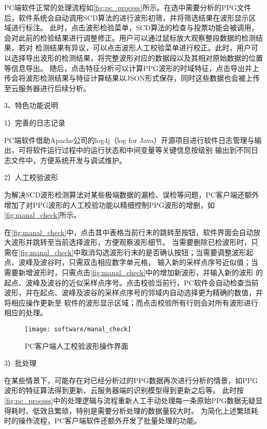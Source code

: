 PC端软件正常的处理流程如\autoref{fig:pc_process}所示。在选中需要分析的PPG文件后，软件系统会自动调用SCD算法的进行波形初筛，并将筛选结果在波形显示区域进行标注。
此时，点击波形检验菜单，SCD算法的检查与投票功能会被调用，会对此前的检验结果进行调整修正。用户可以通过鼠标放大观察整段数据的检测结果，若对
检测结果有异议，可以点击波形人工校验菜单进行校正。此时，用户可以选择导出波形的检测结果，将完整波形对应的数据段以及其相对原始数据的位置等信息导出。
随后，点击特征分析可以计算PPG波形的时域特征，点击导出并上传会将波形检测结果与特征计算结果以JSON形式保存，同时这些数据也会被上传至云服务器进行后续分析。

3、特色功能说明

1）完善的日志记录

PC端软件借助Apache公司的log4j（log for Java）开源项目进行软件日志管理与输出，可将软件运行过程中的运行状态和中间变量等关键信息按级别
输出到不同日志文件中，方便系统开发与调试维护。%

2）人工校验波形

为解决SCD波形检测算法对某些极端数据的漏检、误检等问题，PC客户端还额外增加了对PPG波形的人工校验功能以精细控制PPG波形的增删，如\autoref{fig:manal_check}所示。

在\autoref{fig:manal_check}中，点击其中表格当前行末的跳转至按钮，软件界面会自动放大波形并跳转至当前选择波形，方便观察波形细节。
当需要删除已检波形时，只需在\autoref{fig:manal_check}中取消勾选波形行末的是否确认按钮；当需要调整波形起点、波峰及波谷时，只需双击相应数字单元格，
输入新的采样点序号近似值；当需要新增波形时，只需点击\autoref{fig:manal_check}中的增加新波形，并输入新的波形
的起点、波峰及波谷的近似采样点序号。点击校验当前行，PC软件会自动检查当前波形，并在起点、波峰及波谷的采样点序号的邻域内自动选择更为精确的数值，并将相应操作更新至
软件的波形显示区域；而点击校验所有行则会对所有波形进行相应的处理。
\begin{figure}[htbp]
    \centering
    \texttt{[image: software/manal\_check]}
    \caption{\label{fig:manal_check}PC客户端人工校验波形操作界面}
\end{figure}

3）批处理

在某些情景下，可能存在对已经分析过的PPG数据再次进行分析的情景，如PPG波形的特征算法得到更新、云服务器端的识别模型得到更新之后等。
此时按\autoref{fig:pc_process}中的处理逻辑与流程重新人工手动处理每一条原始PPG数据无疑显得耗时、低效且繁琐，特别是需要分析处理的数据量较大时。
为简化上述繁琐耗时的操作流程，PC客户端软件还额外开发了批量处理的功能。

